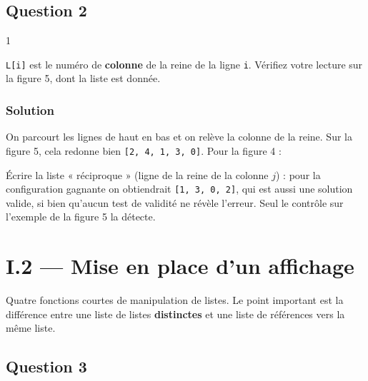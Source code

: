 \documentclass[11pt,a4paper]{article}
\newcommand{\equationajustee}[1]{%
  \sbox{\boiteequation}{$\displaystyle #1$}%
  \ifdim\wd\boiteequation>\linewidth
    \[\resizebox{\linewidth}{!}{\usebox{\boiteequation}}\]%
  \else
    \[#1\]%
  \fi}
\begin{document}
\hypertarget{question-2}{%
\subsection{Question 2}\label{question-2}}

\begin{indication}{1}

\texttt{L{[}i{]}} est le numéro de \textbf{colonne} de la reine de la ligne \texttt{i}. Vérifiez votre lecture sur la figure 5, dont la liste est donnée.

\end{indication}

\hypertarget{solution-1}{%
\subsubsection{Solution}\label{solution-1}}

On parcourt les lignes de haut en bas et on relève la colonne de la reine. Sur la figure 5, cela redonne bien \texttt{{[}2,\ 4,\ 1,\ 3,\ 0{]}}. Pour la figure 4 :

\equationajustee{\boxed{L_{\text{gagnante}} = [2, 0, 3, 1]}}

\equationajustee{\boxed{L_{\text{perdante}} = [0, 2, 3, 1]}}

\begin{piege}

Écrire la liste « réciproque » (ligne de la reine de la colonne \(j\)) : pour la configuration gagnante on obtiendrait \texttt{{[}1,\ 3,\ 0,\ 2{]}}, qui est aussi une solution valide, si bien qu'aucun test de validité ne révèle l'erreur. Seul le contrôle sur l'exemple de la figure 5 la détecte.

\end{piege}

\hypertarget{i.2-mise-en-place-dun-affichage}{%
\section{I.2 --- Mise en place d'un affichage}\label{i.2-mise-en-place-dun-affichage}}

Quatre fonctions courtes de manipulation de listes. Le point important est la différence entre une liste de listes \textbf{distinctes} et une liste de références vers la même liste.

\hypertarget{question-3}{%
\subsection{Question 3}\label{question-3}}
\end{document}

